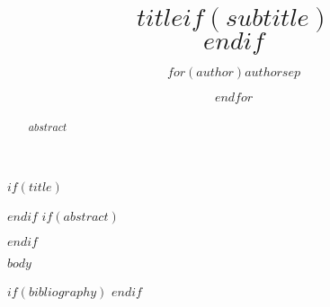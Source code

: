 \documentclass[12pt,a4paper]{article} %
\title{$title$$if(subtitle)$\\\vspace{0.5em}{\large $subtitle$}$endif$}
\author{$for(author)$$author$$sep$ \and $endfor$}
\theoremstyle{plain}
\theoremstyle{definition}
\theoremstyle{remark}
\begin{document}
$if(title)$
\maketitle
$endif$
$if(abstract)$
\begin{abstract}
$abstract$
\end{abstract}
$endif$

$body$

$if(bibliography)$
\printbibliography[title=References]
$endif$
\end{document}
